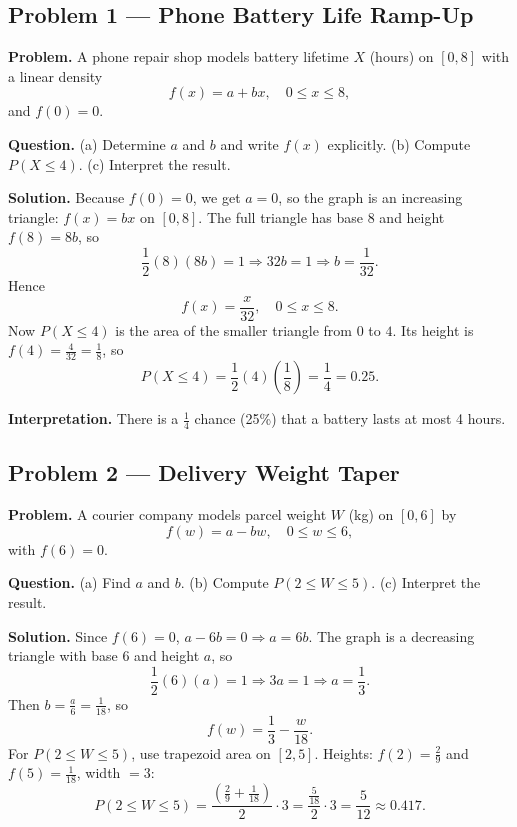 



\begin{ExamProblems}

\item
\subsection*{Problem 1 — Phone Battery Life Ramp-Up}

\textbf{Problem.}
A phone repair shop models battery lifetime $X$ (hours) on $[0,8]$ with a linear density
\[
f(x)=a+bx,\quad 0\le x\le 8,
\]
and $f(0)=0$.

\textbf{Question.}
(a) Determine $a$ and $b$ and write $f(x)$ explicitly. (b) Compute $P(X\le 4)$. (c) Interpret the result.

\textbf{Solution.}
Because $f(0)=0$, we get $a=0$, so the graph is an increasing triangle: $f(x)=bx$ on $[0,8]$.
The full triangle has base $8$ and height $f(8)=8b$, so
\[
\frac{1}{2}(8)(8b)=1\Rightarrow 32b=1\Rightarrow b=\frac{1}{32}.
\]
Hence
\[
f(x)=\frac{x}{32},\quad 0\le x\le 8.
\]
Now $P(X\le 4)$ is the area of the smaller triangle from $0$ to $4$.
Its height is $f(4)=\frac{4}{32}=\frac18$, so
\[
P(X\le 4)=\frac12(4)\left(\frac18\right)=\frac14=0.25.
\]

\textbf{Interpretation.}
There is a $\frac14$ chance (25\%) that a battery lasts at most 4 hours.


\item
\subsection*{Problem 2 — Delivery Weight Taper}

\textbf{Problem.}
A courier company models parcel weight $W$ (kg) on $[0,6]$ by
\[
f(w)=a-bw,\quad 0\le w\le 6,
\]
with $f(6)=0$.

\textbf{Question.}
(a) Find $a$ and $b$. (b) Compute $P(2\le W\le 5)$. (c) Interpret the result.

\textbf{Solution.}
Since $f(6)=0$, $a-6b=0\Rightarrow a=6b$.
The graph is a decreasing triangle with base $6$ and height $a$, so
\[
\frac12(6)(a)=1\Rightarrow 3a=1\Rightarrow a=\frac13.
\]
Then $b=\frac{a}{6}=\frac{1}{18}$, so
\[
f(w)=\frac13-\frac{w}{18}.
\]
For $P(2\le W\le 5)$, use trapezoid area on $[2,5]$.
Heights: $f(2)=\frac{2}{9}$ and $f(5)=\frac{1}{18}$, width $=3$:
\[
P(2\le W\le 5)=\frac{\left(\frac{2}{9}+\frac{1}{18}\right)}{2}\cdot 3
=\frac{\frac{5}{18}}{2}\cdot 3=\frac{5}{12}\approx 0.417.
\]


\end{ExamProblems}
